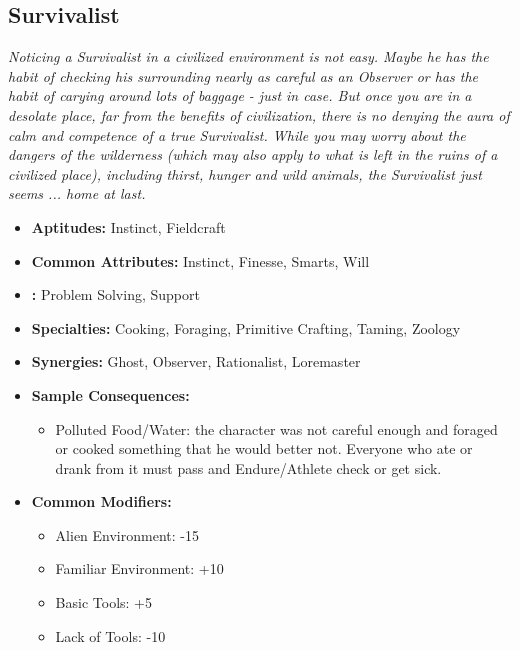 \subsection{Survivalist}\label{Survivalist}
\textit{Noticing a Survivalist in a civilized environment is not easy.
Maybe he has the habit of checking his surrounding nearly as careful as an Observer or has the habit of carying around lots of baggage - just in case.
But once you are in a desolate place, far from the benefits of civilization, there is no denying the aura of calm and competence of a true Survivalist.
While you may worry about the dangers of the wilderness (which may also apply to what is left in the ruins of a civilized place), including thirst, hunger and wild animals, the Survivalist just seems ... home at last.}
\begin{itemize}
	\item \textbf{Aptitudes:} Instinct, Fieldcraft
	\item \textbf{Common Attributes:} Instinct, Finesse, Smarts, Will
	\item \textbf{:} Problem Solving, Support
	\item \textbf{Specialties:} Cooking, Foraging, Primitive Crafting, Taming, Zoology 	
	\item \textbf{Synergies:} Ghost, Observer, Rationalist, Loremaster
	\item \textbf{Sample Consequences:} 
	\begin{itemize}
		\item Polluted Food/Water: the character was not careful enough and foraged or cooked something that he would better not. Everyone who ate or drank from it must pass and Endure/Athlete check or get sick.
	\end{itemize}
	\item \textbf{Common Modifiers:}
	\begin{itemize}
		\item Alien Environment: -15
		\item Familiar Environment: +10
		\item Basic Tools: +5
		\item Lack of Tools: -10
	\end{itemize}
\end{itemize}

